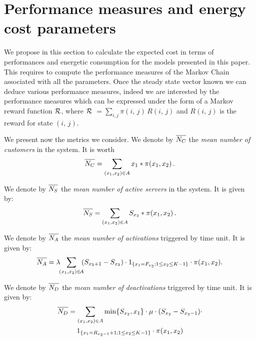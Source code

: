 \documentclass[conference]{IEEEtran}
\begin{document}
\section{Performance measures and energy cost parameters}
\label{sec:ParamPerf}

We propose in this section to calculate the expected cost in terms of performances and energetic consumption
for the models presented in this paper. This requires to compute the performance measures of the Markov Chain associated with
all the parameters. Once the steady state vector known we can deduce various performance measures, indeed 
we are interested by the performance measures which can be expressed under the form of a Markov reward 
function $\cal{R}$, where $\cal{R}$ $=\sum_{i,j}\pi(i,\,j) \,R(i,\,j)$  and $R(i,\,j)$ is the reward for state $(i,\,j)$.
 
We present now the metrics we consider.
We denote by $\overline{\mathstrut N_{C}}$ 
the \emph{mean number of customers} in the system. It is worth
\begin{equation}
\overline{\mathstrut N_{C}}=\sum_{(x_{1},x_{2}) \in A}x_{1}*\pi(x_{1},x_{2}) \, .
\end{equation}

We denote by $\overline{\mathstrut N_{S}}$ the \emph{mean number of active servers} in the system.
It is given by:
\begin{equation}
\overline{\mathstrut N_{S}}=\sum_{(x_{1},x_{2}) \in A}S_{x_{2}}*\pi(x_{1},x_{2}) \, .
\end{equation}

We denote by $\overline{\mathstrut N_{A}}$ the 
\emph{mean number of activations} triggered by time unit.
It is given by:
\begin{equation}
\overline{\mathstrut N_{A}}= 
\lambda \! \! \sum_{(x_{1},x_{2}) \in \! A} \! \! (S_{x_2+1} -  S_{x_2}) \cdot 1_{\{x_{1}=F_{x_2} ; 1 \leq x_2 \leq K-1\}} \cdot \pi(x_{1},x_{2}) .
\end{equation}

We denote by $\overline{\mathstrut N_{D}}$ the
\emph{mean number of deactivations} triggered by time unit. It is given by:
\begin{multline}
\overline{\mathstrut N_{D}}=\sum_{(x_{1},x_{2}) \in A} \min\{S_{x_{2}},x_{1}\} \cdot \mu \cdot (S_{x_2}-S_{x_2-1}) \cdot \\
1_{\{x_{1}=R_{x_2-1}+1  \mbox{ ; } 1 \leq x_2 \leq K-1\}}
\cdot \pi(x_{1},x_{2})
\end{multline}
\end{document}
